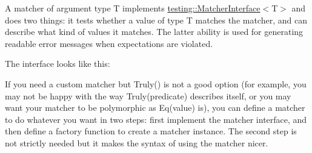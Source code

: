 A matcher of argument type {\ttfamily T} implements {\ttfamily \mbox{\hyperlink{classtesting_1_1_matcher_interface}{testing\+::\+Matcher\+Interface}}$<$T$>$} and does two things\+: it tests whether a value of type {\ttfamily T} matches the matcher, and can describe what kind of values it matches. The latter ability is used for generating readable error messages when expectations are violated.

The interface looks like this\+:


\begin{DoxyCode}{0}
\DoxyCodeLine{}
\DoxyCodeLine{\};}
\DoxyCodeLine{}
\DoxyCodeLine{}
\DoxyCodeLine{}
\DoxyCodeLine{}
\DoxyCodeLine{\};}
\end{DoxyCode}


If you need a custom matcher but {\ttfamily Truly()} is not a good option (for example, you may not be happy with the way {\ttfamily Truly(predicate)} describes itself, or you may want your matcher to be polymorphic as {\ttfamily Eq(value)} is), you can define a matcher to do whatever you want in two steps\+: first implement the matcher interface, and then define a factory function to create a matcher instance. The second step is not strictly needed but it makes the syntax of using the matcher nicer.

